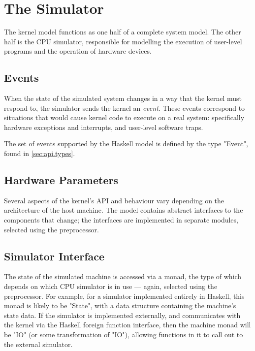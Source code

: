 \section{The Simulator}\label{sec:haskell.simulator}

The kernel model functions as one half of a complete system model. The other half is the CPU simulator, responsible for modelling the execution of user-level programs and the operation of hardware devices.

\subsection{Events}

When the state of the simulated system changes in a way that the kernel must respond to, the simulator sends the kernel an \emph{event}. These events correspond to situations that would cause kernel code to execute on a real system: specifically hardware exceptions and interrupts, and user-level software traps.

The set of events supported by the Haskell model is defined by the type "Event", found in \autoref{sec:api.types}.

\subsection{Hardware Parameters}

Several aspects of the kernel's API and behaviour vary depending on the architecture of the host machine. The model contains abstract interfaces to the components that change; the interfaces are implemented in separate modules, selected using the preprocessor.

\subsection{Simulator Interface}\label{sec:haskell.simulator.monad}

The state of the simulated machine is accessed via a monad, the type of which depends on which CPU simulator is in use --- again, selected using the preprocessor. For example, for a simulator implemented entirely in Haskell, this monad is likely to be "State", with a data structure containing the machine's state data. If the simulator is implemented externally, and communicates with the kernel via the Haskell foreign function interface, then the machine monad will be "IO" (or some transformation of "IO"), allowing functions in it to call out to the external simulator.

